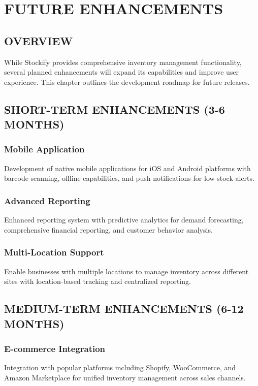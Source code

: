 \chapter{FUTURE ENHANCEMENTS}

\section{OVERVIEW}

While Stockify provides comprehensive inventory management functionality, several planned enhancements will expand its capabilities and improve user experience. This chapter outlines the development roadmap for future releases.

\section{SHORT-TERM ENHANCEMENTS (3-6 MONTHS)}

\subsection{Mobile Application}
Development of native mobile applications for iOS and Android platforms with barcode scanning, offline capabilities, and push notifications for low stock alerts.

\subsection{Advanced Reporting}
Enhanced reporting system with predictive analytics for demand forecasting, comprehensive financial reporting, and customer behavior analysis.

\subsection{Multi-Location Support}
Enable businesses with multiple locations to manage inventory across different sites with location-based tracking and centralized reporting.

\section{MEDIUM-TERM ENHANCEMENTS (6-12 MONTHS)}

\subsection{E-commerce Integration}
Integration with popular platforms including Shopify, WooCommerce, and Amazon Marketplace for unified inventory management across sales channels.

